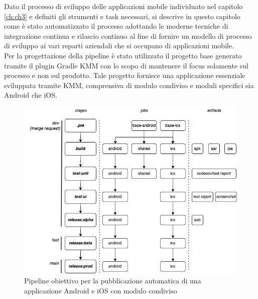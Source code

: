 
Dato il processo di sviluppo delle applicazioni mobile individuato nel capitolo \ref{ch:ch3} e definiti gli strumenti e task necessari, si descrive in questo capitolo come è stato automatizzato il processo adottando le moderne tecniche di integrazione continua e rilascio continuo al fine di fornire un modello di processo di sviluppo ai vari reparti aziendali che si occupano di applicazioni mobile.\\
Per la progettazione della pipeline è stato utilizzato il progetto base generato tramite il plugin Gradle KMM con lo scopo di mantenere il focus solamente sul processo e non sul prodotto. Tale progetto fornisce una applicazione essenziale sviluppata tramite KMM, comprensiva di modulo condiviso e moduli specifici sia Android che iOS.

\begin{figure}[H]
\centering
\includegraphics[width=1\textwidth]{img/tesi-11-cicd.drawio.png}
\caption{Pipeline obiettivo per la pubblicazione automatica di una applicazione Android e iOS con modulo condiviso}
\end{figure}

